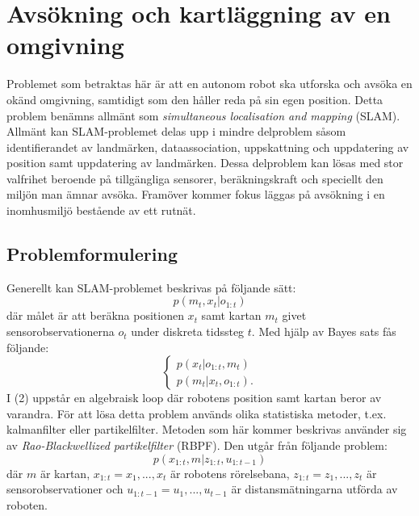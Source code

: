 \documentclass[12pt]{article}
\begin{document}
	\pagebreak
	
	\section{Avsökning och kartläggning av en omgivning} 
	
	
	Problemet som betraktas här är att en autonom robot ska utforska och avsöka en okänd omgivning, samtidigt som den håller reda på sin egen position. Detta problem benämns allmänt som \textit{simultaneous localisation and mapping} (SLAM). Allmänt kan SLAM-problemet delas upp i mindre delproblem såsom identifierandet av landmärken, dataassociation, uppskattning och uppdatering av position samt uppdatering av landmärken. Dessa delproblem kan lösas med stor valfrihet beroende på tillgängliga sensorer, beräkningskraft och speciellt den miljön man ämnar avsöka. Framöver kommer fokus läggas på avsökning i en inomhusmiljö bestående av ett rutnät. \autocite{gris-07}
	
	
	\subsection{Problemformulering}
	Generellt kan SLAM-problemet beskrivas på följande sätt:
	\begin{equation}
	p(m_{t},x_{t}|o_{1:t})
	\end{equation}
	där målet är att beräkna positionen $x_{t}$ samt kartan $m_{t}$ givet sensorobservationerna $o_{t}$ under diskreta tidssteg $t$. Med hjälp av Bayes sats fås följande:
	\begin{equation}
	\left\{\begin{matrix}
        p(x_{t}|o_{1:t},m_{t})\\
        p(m_{t}|x_{t},o_{1:t}).
        \end{matrix}\right.
	\end{equation}
	I (2) uppstår en algebraisk loop där robotens position samt kartan beror av varandra. För att lösa detta problem används olika statistiska metoder, t.ex. kalmanfilter eller partikelfilter. Metoden som här kommer beskrivas använder sig av \textit{Rao-Blackwellized partikelfilter} (RBPF). Den utgår från följande problem:
	\begin{equation}
	p(x_{1:t},m|z_{1:t},u_{1:t-1})
	\end{equation}
där $m$ är kartan, $x_{1:t}=x_{1},...,x_{t}$ är robotens rörelsebana,  $z_{1:t}=z_{1},...,z_{t}$ är sensorobservationer och $u_{1:t-1}=u_{1},...,u_{t-1}$ är distansmätningarna utförda av roboten.
\end{document}
